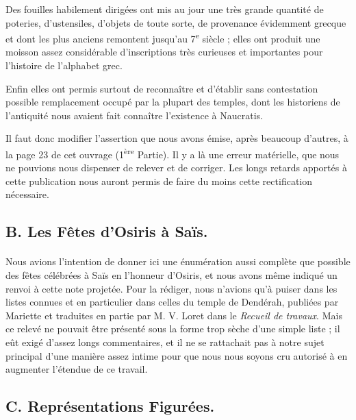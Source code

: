 \documentclass[a4paper, 11pt, oneside]{article}
\begin{document}
Des fouilles habilement dirigées ont mis au jour une très grande quantité de poteries, d'ustensiles, d'objets de toute sorte, de provenance évidemment grecque et dont les plus anciens remontent jusqu'au 7\textsuperscript{e} siècle ; elles ont produit une moisson assez considérable d'inscriptions très curieuses et importantes pour l'histoire de l'alphabet grec.

Enfin elles ont permis surtout de reconnaître et d'établir sans contestation possible remplacement occupé par la plupart des temples, dont les historiens de l'antiquité nous avaient fait connaître l'existence à Naucratis.

Il faut donc modifier l'assertion que nous avons émise, après beaucoup d'autres, à la page 23 de cet ouvrage (1\textsuperscript{ère} Partie). Il y a là une erreur matérielle, que nous ne pouvions nous dispenser de relever et de corriger. Les longs retards apportés à cette publication nous auront permis de faire du moins cette rectification nécessaire.
\clearpage
\subsection{B. Les Fêtes d'Osiris à Saïs.}
\paragraph{}
Nous avions l'intention de donner ici une énumération aussi complète que possible des fêtes célébrées à Saïs en l'honneur d'Osiris, et nous avons même indiqué un renvoi à cette note projetée. Pour la rédiger, nous n'avions qu'à puiser dans les listes connues et en particulier dans celles du temple de Dendérah, publiées par Mariette et traduites en partie par M. V. Loret dans le \emph{Recueil de travaux}. Mais ce relevé ne pouvait être présenté sous la forme trop sèche d'une simple liste ; il eût exigé d'assez longs commentaires, et il ne se rattachait pas à notre sujet principal d'une manière assez intime pour que nous nous soyons cru autorisé à en augmenter l'étendue de ce travail.
\clearpage
\subsection{C. Représentations Figurées.}
\end{document}
